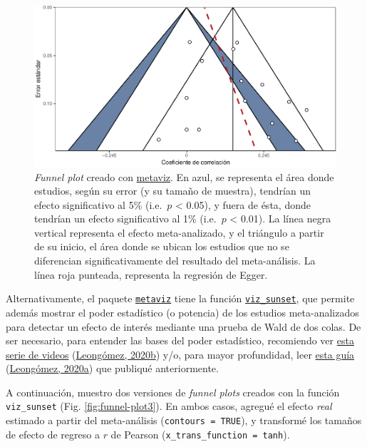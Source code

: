 \documentclass[
  bookmarksnumbered]{article}
\begin{document}
\begin{figure}
\centering
\includegraphics{Meta-analysis_files/figure-latex/funnel-plot2-1.pdf}
\caption{\label{fig:funnel-plot2}\emph{Funnel plot} creado con \href{https://cran.r-project.org/web/packages/metaviz/vignettes/metaviz.html}{metaviz}. En azul, se representa el área donde estudios, según su error (y su tamaño de muestra), tendrían un efecto significativo al 5\% (i.e.~\(p\) \textless{} 0.05), y fuera de ésta, donde tendrían un efecto significativo al 1\% (i.e.~\(p\) \textless{} 0.01). La línea negra vertical representa el efecto meta-analizado, y el triángulo a partir de su inicio, el área donde se ubican los estudios que no se diferencian significativamente del resultado del meta-análisis. La línea roja punteada, representa la regresión de Egger.}
\end{figure}

Alternativamente, el paquete \href{https://cran.r-project.org/web/packages/metaviz/vignettes/metaviz.html}{\texttt{metaviz}} tiene la función \href{https://cran.r-project.org/web/packages/metaviz/vignettes/metaviz.html\#sunset-power-enhanced-funnel-plots}{\texttt{viz\_sunset}}, que permite además mostrar el poder estadístico (o potencia) de los estudios meta-analizados para detectar un efecto de interés mediante una prueba de Wald de dos colas. De ser necesario, para entender las bases del poder estadístico, recomiendo ver \href{https://youtube.com/playlist?list\%20=\%20PLHk7UNt35ccVdyHqnQ6oXVYA6JBNFrE1x}{esta serie de videos} (\protect\hyperlink{ref-leongomezPoderRvid2020}{Leongómez, 2020b}) y/o, para mayor profundidad, leer \href{https://doi.org/10.5281/zenodo.3988776}{esta guía} (\protect\hyperlink{ref-leongomezAnalisisPoderEstadistico2020}{Leongómez, 2020a}) que publiqué anteriormente.

A continuación, muestro dos versiones de \emph{funnel plots} creados con la función \texttt{viz\_sunset} (Fig. \ref{fig:funnel-plot3}). En ambos casos, agregué el efecto \emph{real} estimado a partir del meta-análisis (\texttt{contours\ =\ TRUE}), y transformé los tamaños de efecto de regreso a \(r\) de Pearson (\texttt{x\_trans\_function\ =\ tanh}).
\end{document}
